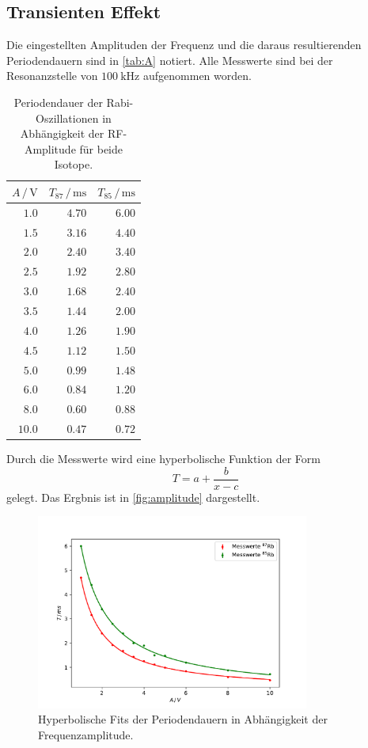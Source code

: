 \subsection{Transienten Effekt}
\label{ssec:transient}

Die eingestellten Amplituden der Frequenz und die daraus resultierenden Periodendauern sind in \autoref{tab:A} notiert.
Alle Messwerte sind bei der Resonanzstelle von $\qty{100}{\kilo\hertz}$ aufgenommen worden.
\begin{table}
    \centering
    \caption{Periodendauer der Rabi-Oszillationen in Abhängigkeit der RF-Amplitude für beide Isotope.}
    \label{tab:A}
    \begin{tabular}{r r r}
        \toprule
        $A \,/\, \unit{\volt}$ & $T_\text{87} \,/\, \unit{\milli\second}$ & $T_\text{85} \,/\, \unit{\milli\second}$\\
        \midrule
        $1.0 $ & $4.70 $ & $6.00 $\\
        $1.5 $ & $3.16 $ & $4.40 $\\
        $2.0 $ & $2.40 $ & $3.40 $\\
        $2.5 $ & $1.92 $ & $2.80 $\\
        $3.0 $ & $1.68 $ & $2.40 $\\
        $3.5 $ & $1.44 $ & $2.00 $\\
        $4.0 $ & $1.26 $ & $1.90 $\\
        $4.5 $ & $1.12 $ & $1.50 $\\
        $5.0 $ & $0.99 $ & $1.48 $\\
        $6.0 $ & $0.84 $ & $1.20 $\\
        $8.0 $ & $0.60 $ & $0.88 $\\
        $10.0$ & $ 0.47$ & $0.72 $\\
        \bottomrule
    \end{tabular}
\end{table}
Durch die Messwerte wird eine hyperbolische Funktion der Form
\begin{equation*}
    T = a + \frac{b}{x - c}
\end{equation*}
gelegt. 
Das Ergbnis ist in \autoref{fig:amplitude} dargestellt.
\begin{figure}
    \centering
    \includegraphics[width=0.8\textwidth]{plots/amplitude.pdf}
    \caption{Hyperbolische Fits der Periodendauern in Abhängigkeit der Frequenzamplitude.}
    \label{fig:amplitude}
\end{figure}
